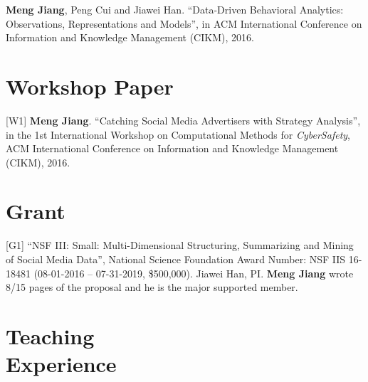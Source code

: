 \documentclass[margin, 10pt]{res}
\begin{document}
\begin{resume}
[T2] \textbf{Meng Jiang}, Peng Cui and Jiawei Han. ``Data-Driven Behavioral Analytics: Observations, Representations and Models'', in ACM International Conference on Information and Knowledge Management (CIKM), 2016.


\section{Workshop Paper}

[W1] \textbf{Meng Jiang}. ``Catching Social Media Advertisers with Strategy Analysis'', in the 1st International Workshop on Computational Methods for \textit{CyberSafety}, ACM International Conference on Information and Knowledge Management (CIKM), 2016.


\section{Grant}

[G1] ``NSF III: Small: Multi-Dimensional Structuring, Summarizing and Mining of Social Media Data'', National Science Foundation Award Number: NSF IIS 16-18481 (08-01-2016 -- 07-31-2019, \$500,000). Jiawei Han, PI. \textbf{Meng Jiang} wrote 8/15 pages of the proposal and he is the major supported member.


\section{Teaching \\ Experience}


\end{resume}
\end{document}

